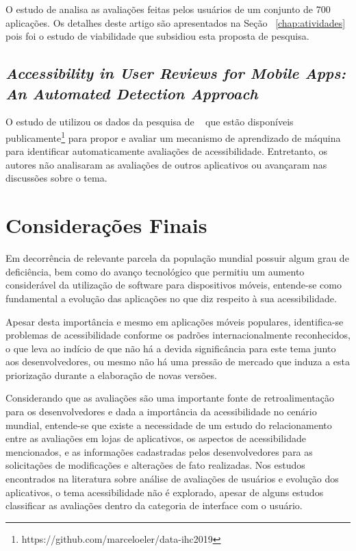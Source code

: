 O estudo de  analisa as avaliações feitas pelos usuários de um conjunto de 700 aplicações. Os detalhes deste artigo são apresentados na Seção~ \ref{chap:atividades} pois foi o estudo de viabilidade que subsidiou esta proposta de pesquisa.


\subsection{\textit{Accessibility in User Reviews for Mobile Apps: An Automated Detection Approach}}

O estudo de  utilizou os dados da pesquisa de ~ que estão disponíveis publicamente\footnote{https://github.com/marceloeler/data-ihc2019} para propor e avaliar um mecanismo de aprendizado de máquina para identificar automaticamente avaliações de acessibilidade. Entretanto, os autores não analisaram as avaliações de outros aplicativos ou avançaram nas discussões sobre o tema.


\section{Considerações Finais}
Em decorrência de relevante parcela da população mundial possuir algum grau de deficiência, bem como do avanço tecnológico que permitiu um aumento considerável da utilização de software para dispositivos móveis, entende-se como fundamental a evolução das aplicações no que diz respeito à sua acessibilidade.

Apesar desta importância e mesmo em aplicações móveis populares, identifica-se problemas de acessibilidade conforme os padrões internacionalmente reconhecidos, o que leva ao indício de que não há a devida significância para este tema junto aos desenvolvedores, ou mesmo não há uma pressão de mercado que induza a esta priorização durante a elaboração de novas versões.

Considerando que as avaliações são uma importante fonte de retroalimentação para os desenvolvedores e dada a importância da acessibilidade no cenário mundial, entende-se que existe a necessidade de um estudo do relacionamento entre as avaliações em lojas de aplicativos, os aspectos de acessibilidade mencionados, e as informações cadastradas pelos desenvolvedores para as solicitações de modificações e alterações de fato realizadas. Nos estudos encontrados na literatura sobre análise de avaliações de usuários e evolução dos aplicativos, o tema acessibilidade não é explorado, apesar de alguns estudos classificar as avaliações dentro da categoria de interface com o usuário. 
